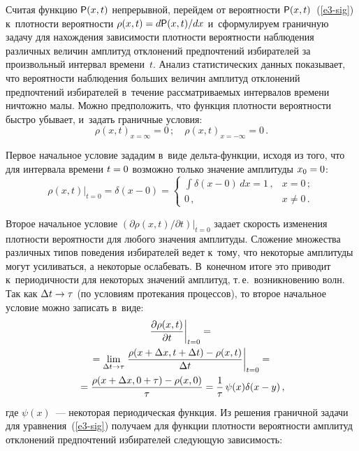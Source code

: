 \begin{multicols}{2}
    Считая функцию ${\sf P}(x, t)$ непрерывной, пе\-рей\-дем от вероятности ${\sf P}(x, 
t)$~(\ref{e3-sig}) к~плотности вероятности $\rho(x, t)\hm=d{\sf P}(x, t)/dx$ 
и~сформулируем граничную задачу для нахождения за\-ви\-си\-мости \mbox{плотности} 
вероятности наблюдения различных величин амп\-ли\-туд отклонений 
предпочтений избирателей за произвольный интервал времени~$t$. Анализ 
статистических данных показывает, что вероятности наблюдения больших 
величин амплитуд отклонений предпочтений избирателей в~течение 
рассматриваемых интервалов времени ничтожно малы. Можно предположить, 
что функция плот\-ности ве\-ро\-ят\-ности быст\-ро убывает, и~задать граничные 
условия: 
    \begin{equation*}
    \rho(x,t)_{x=\infty} =0\,;\quad
    \rho(x,t)_{x=-\infty} =0\,.
    \end{equation*}
    
    Первое начальное условие зададим в~виде дель\-та-функ\-ции, исходя из 
того, что для интервала времени $t\hm = 0$ возможно только значение 
амплитуды $x_0\hm=0$: 
    $$
    \rho(x,t)\vert_{t=0} =\delta(x-0) =\begin{cases}
    \displaystyle \int \delta(x-0)\,dx=1\,, &\! x=0\,;\\
    0\,, &\! x\not= 0\,.
    \end{cases}
    $$
    
    Второе начальное условие $(\partial \rho(x,t)/\partial t)\vert_{t=0}$ задает 
скорость изменения плотности вероятности для любого значения амплитуды. 
Сложение множества различных типов поведения избирателей ведет к~тому, 
что некоторые амплитуды могут усиливаться, а некоторые ослабевать. 
В~конечном итоге это приводит к~периодичности для некоторых значений 
амплитуд, т.\,е.\ возникновению волн. Так как $\Delta t\hm\to \tau$ (по условиям 
протекания процессов), то второе начальное условие можно записать в~виде: 
    \begin{multline*}
    \left.\displaystyle\frac{\displaystyle \partial \rho(x,t)\mathstrut}{\displaystyle \partial t\mathstrut}\right\vert_{t=0} ={}\\
    {}=
    \lim\limits_{\Delta t \to\tau} 
    \left. \displaystyle\frac{\displaystyle \rho(x+\Delta x, t+\Delta t)-\rho(x,t)\mathstrut}{\displaystyle \Delta t\mathstrut}\right\vert_{t=0}={}\\
    {}= 
    \displaystyle\frac{\displaystyle \rho(x+\Delta x, 0+\tau)-\rho(x,0)\mathstrut}{\displaystyle \tau\mathstrut}=\displaystyle\frac{\displaystyle 1\mathstrut}{\displaystyle \tau\mathstrut}\,\psi(x)\delta(x-y)\,,
    \end{multline*}
где $\psi(x)$~--- некоторая периодическая функция. Из решения граничной задачи 
для уравнения~(\ref{e3-sig}) получаем для функции плотности вероятности 
амплитуд отклонений предпочтений избирателей следующую зависимость: 


\end{multicols}
